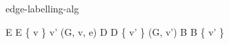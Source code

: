 \documentclass{article}
\begin{document}
\begin{ppprog}{edge-labelling-alg}

    \pp E \leftarrow E \cup \{ v \}
            \pp v' \leftarrow {}(G, v, e)
                \pp D \leftarrow D \cup \{ v' \}
                \pp {}(G, v')
            \Else
                \pp B \leftarrow B \cup \{ v' \}
            \Fi
        \Fi
    \Done
    \pp {}

\end{ppprog}
\end{document}
